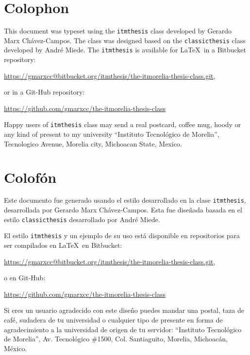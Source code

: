 
\pagestyle{empty}
\hfill
\vfill
{}
\section*{Colophon}

This document was typeset using the  \texttt{itmthesis} class developed by Gerardo Marx Chávez-Campos. The class was designed based on the \texttt{classicthesis} class developed by Andr\'e Miede. The \texttt{itmthesis} is available for \LaTeX\ in a Bitbucket repository: 

\begin{center}
\url{https://gmarxcc@bitbucket.org/itmthesis/the-itmorelia-thesis-class.git}, 
\end{center}
or in a Git-Hub repository:

\begin{center}
\url{https://github.com/gmarxcc/the-itmorelia-thesis-class}
\end{center}

\noindent Happy users of \texttt{itmthesis} class may send a real postcard, coffee mug, hoody or any kind of present to my university ``Instituto Tecnológico de Morelia'', Tecnologico Avenue, Morelia city,  Michoacan State, Mexico.

\section*{Colofón}

Este documento fue generado usando el estilo desarrollado en la clase \texttt{itmthesis}, desarrollada por Gerardo Marx Chávez-Campos. Esta  fue diseñada basada en el estilo \texttt{classicthesis} desarrollado por Andr\'e Miede. 

El estilo \texttt{itmthesis} y un ejemplo de su uso está disponible en repositorios para ser compilados en \LaTeX\ en Bitbucket: 

\begin{center}
\url{https://gmarxcc@bitbucket.org/itmthesis/the-itmorelia-thesis-class.git}, 
\end{center}
o en Git-Hub:

\begin{center}
\url{https://github.com/gmarxcc/the-itmorelia-thesis-class}
\end{center}

\noindent Si eres un usuario agradecido con este diseño puedes mandar una postal, taza de café, sudadera de tu universidad o cualquier tipo de presente en forma de agradecimiento a la universidad de origen de tu servidor: ``Instituto Tecnológico de Morelia'', Av. Tecnológico \#1500, Col. Santiaguito, Morelia,  Michoacán, México.